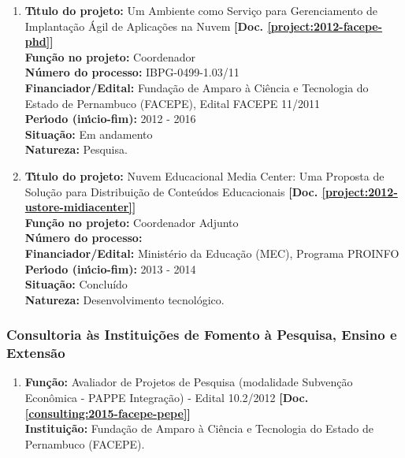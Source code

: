 \documentclass[a4paper,oneside,10pt]{article}
\begin{document}
\begin{enumerate}
\item \textbf{T\'{\i}tulo do projeto:} Um Ambiente como Serviço para Gerenciamento de Implantação Ágil de Aplicações na Nuvem \textbf{[Doc. \ref{project:2012-facepe-phd}]}\\
      \textbf{Fun\c{c}\~{a}o no projeto:} Coordenador\\
      \textbf{N\'{u}mero do processo:} IBPG-0499-1.03/11\\
      \textbf{Financiador/Edital:} Fundação de Amparo à Ciência e Tecnologia do Estado de Pernambuco (FACEPE), Edital FACEPE 11/2011\\
      \textbf{Per\'{\i}odo (in\'{\i}cio-fim):} 2012 - 2016\\
      \textbf{Situação:} Em andamento \\
      \textbf{Natureza:} Pesquisa.

\item \textbf{T\'{\i}tulo do projeto:} Nuvem Educacional Media Center: Uma Proposta de Solução para Distribuição de Conteúdos Educacionais \textbf{[Doc. \ref{project:2012-ustore-midiacenter}]}\\
      \textbf{Fun\c{c}\~{a}o no projeto:} Coordenador Adjunto\\
      \textbf{N\'{u}mero do processo:} \\
      \textbf{Financiador/Edital:} Ministério da Educação (MEC), Programa PROINFO\\
      \textbf{Per\'{\i}odo (in\'{\i}cio-fim):} 2013 - 2014\\
      \textbf{Situação:} Concluído \\
      \textbf{Natureza:} Desenvolvimento tecnológico.

\end{enumerate}


\subsubsection{Consultoria \`{a}s Institui\c{c}\~{o}es de Fomento \`{a} Pesquisa, Ensino e Extens\~{a}o}
\vspace{0.3cm}

\begin{enumerate}
\renewcommand{\labelenumi}{{\large\bfseries\arabic{enumi}.}}

\item   \textbf{Fun\c{c}\~{a}o:} Avaliador de Projetos de Pesquisa (modalidade Subven\c{c}\~{a}o Econ\^{o}mica - PAPPE Integra\c{c}\~{a}o) - Edital 10.2/2012 \textbf{[Doc. \ref{consulting:2015-facepe-pepe}]}\\
        \textbf{Institui\c{c}\~{a}o:} Fundação de Amparo à Ciência e Tecnologia do Estado de Pernambuco (FACEPE).


\end{enumerate}
\end{document}
